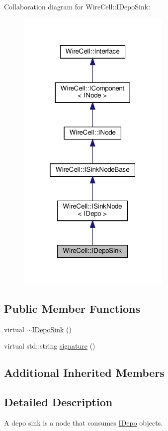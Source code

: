 Collaboration diagram for Wire\+Cell\+:\+:I\+Depo\+Sink\+:
\nopagebreak
\begin{figure}[H]
\begin{center}
\leavevmode
\includegraphics[width=208pt]{class_wire_cell_1_1_i_depo_sink__coll__graph}
\end{center}
\end{figure}
\subsection*{Public Member Functions}
\begin{DoxyCompactItemize}
\item 
virtual \hyperlink{class_wire_cell_1_1_i_depo_sink_a9b31ce6e2b2aee6099917257c55ba71b}{$\sim$\+I\+Depo\+Sink} ()
\item 
virtual std\+::string \hyperlink{class_wire_cell_1_1_i_depo_sink_a9cadeb680909c9d3e4726cd77cfab588}{signature} ()
\end{DoxyCompactItemize}
\subsection*{Additional Inherited Members}


\subsection{Detailed Description}
A depo sink is a node that consumes \hyperlink{class_wire_cell_1_1_i_depo}{I\+Depo} objects. 

